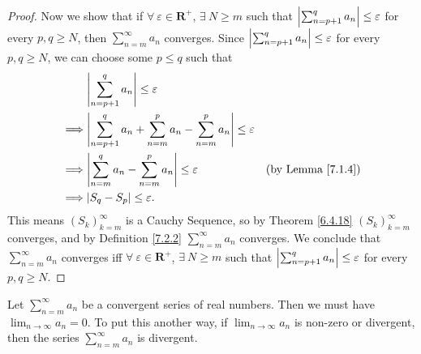 \begin{proof}
    Now we show that if \(\forall\ \varepsilon \in \mathbf{R}^+\), \(\exists\ N \geq m\) such that \(\abs*{\sum_{n = p + 1}^q a_n} \leq \varepsilon\) for every \(p, q \geq N\), then \(\sum_{n = m}^\infty a_n\) converges.
    Since \(\abs*{\sum_{n = p + 1}^q a_n} \leq \varepsilon\) for every \(p, q \geq N\), we can choose some \(p \leq q\) such that
    \begin{align*}
                 & \abs*{\sum_{n = p + 1}^q a_n} \leq \varepsilon                                                                           \\
        \implies & \abs*{\sum_{n = p + 1}^q a_n + \sum_{n = m}^p a_n - \sum_{n = m}^p a_n} \leq \varepsilon                                 \\
        \implies & \abs*{\sum_{n = m}^q a_n - \sum_{n = m}^p a_n} \leq \varepsilon                          & \text{(by Lemma \ref{7.1.4})} \\
        \implies & \abs*{S_q - S_p} \leq \varepsilon.
    \end{align*}
    This means \((S_k)_{k = m}^\infty\) is a Cauchy Sequence, so by Theorem \ref{6.4.18} \((S_k)_{k = m}^\infty\) converges, and by Definition \ref{7.2.2} \(\sum_{n = m}^\infty a_n\) converges.
    We conclude that \(\sum_{n = m}^\infty a_n\) converges iff \(\forall\ \varepsilon \in \mathbf{R}^+\), \(\exists\ N \geq m\) such that \(\abs*{\sum_{n = p + 1}^q a_n} \leq \varepsilon\) for every \(p, q \geq N\).
\end{proof}

\begin{corollary}\label{7.2.6}
    Let \(\sum_{n = m}^\infty a_n\) be a convergent series of real numbers.
    Then we must have \(\lim_{n \to \infty} a_n = 0\).
    To put this another way, if \(\lim_{n \to \infty} a_n\) is non-zero or divergent, then the series \(\sum_{n = m}^\infty a_n\) is divergent.
\end{corollary}

